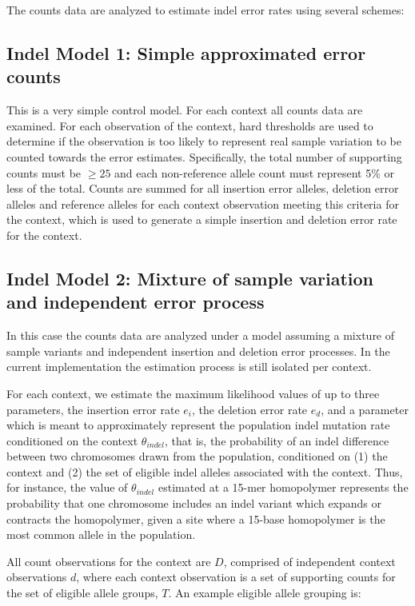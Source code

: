 \documentclass{article}
\begin{document}
The counts data are analyzed to estimate indel error rates using several schemes:

\subsection{Indel Model 1: Simple approximated error counts}

This is a very simple control model. For each context all counts data are examined. For each observation of the context, hard thresholds are used to determine if the observation is too likely to represent real sample variation to be counted towards the error estimates. Specifically, the total number of supporting counts must be $\geq 25$ and each non-reference allele count must represent 5\% or less of the total. Counts are summed for all insertion error alleles, deletion error alleles and reference alleles for each context observation meeting this criteria for the context, which is used to generate a simple insertion and deletion error rate for the context.

\subsection{Indel Model 2: Mixture of sample variation and independent error process}

In this case the counts data are analyzed under a model assuming a mixture of sample variants and independent insertion and deletion error processes. In the current implementation the estimation process is still isolated per context.

For each context, we estimate the maximum likelihood values of up to three parameters, the insertion error rate $e_i$, the deletion error rate $e_d$, and a parameter which is meant to approximately represent the population indel mutation rate conditioned on the context $\theta_{indel}$, that is, the probability of an indel difference between two chromosomes drawn from the population, conditioned on (1) the context and (2) the set of eligible indel alleles associated with the context. Thus, for instance, the value of $\theta_{indel}$ estimated at a 15-mer homopolymer represents the probability that one chromosome includes an indel variant which expands or contracts the homopolymer, given a site where a 15-base homopolymer is the most common allele in the population.

All count observations for the context are $D$, comprised of independent context observations $d$, where each context observation is a set of supporting counts for the set of eligible allele groups, $T$. An example eligible allele grouping is:
\end{document}
